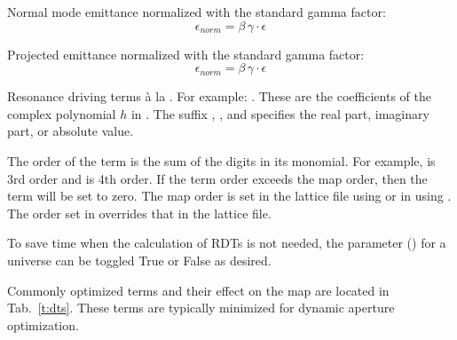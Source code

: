 \begin{description}
{  %
  \item[norm_emit.a, .b, .c] \Newline {}
Normal mode emittance normalized with the standard gamma factor:
\begin{equation}
  \epsilon_{norm} = \beta \, \gamma \cdot \epsilon
\end{equation}

  \item[norm_emit.x, .y, .z] \Newline {}
Projected emittance normalized with the standard gamma factor:
\begin{equation}
  \epsilon_{norm} = \beta \, \gamma \cdot \epsilon
\end{equation}

  \item[normal.h.<monomial>.\{r,i,a\}] \Newline {}
Resonance driving terms \`a la \cite{b:bengtsson}.  For example: .  These are the
coefficients of the complex polynomial $h$ in .  The suffix , , and
 specifies the real part, imaginary part, or absolute value.

The order of the term is the sum of the digits in its monomial.  For example,  is 3rd
order and  is 4th order.  If the term order exceeds the map order, then the term will be
set to zero. The map order is set in the lattice file using 
or in  using .  The order set in 
overrides that in the lattice file.

To save time when the calculation of RDTs is not needed, the  parameter
() for a universe can be toggled True or False as desired.

Commonly optimized terms and their effect on the map are located in Tab.~\ref{t:dts}.  These terms are typically
minimized for dynamic aperture optimization.

}
\end{description}
